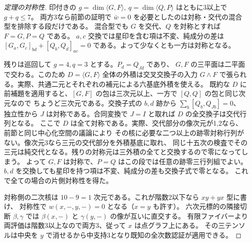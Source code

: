 \begin{proof}[定理の対称性]
印付きの $g=\dim\langle G,F\rangle,\ q=\dim\langle Q,P\rangle$ はともに3以上で $g+q\le7$。
両方3なら前節の証明で $\bar w=0$ を必要としたのは対称・交代の混合型を排除する段だけである。
混合型でも $G$ を交代、$Q$ を対称とすれば $F=G,P=Q$ である。
$a,c$ 交換では星印を含む項は不変、純成分の差は
$[G_a,G_c]_{bd}+[Q_b,Q_d]_{ac}=0$ である。よって少なくとも一方は対称となる。

残りは巡回して $g=4,q=3$ とする。$P_d=Q_{Jd}$ であり、
$G,F$ の三平面は二平面で交わる。このため $D=\langle G,F\rangle$ 全体の外積は交叉交換子の入力
$G\wedge F$ で張られる。実際、共通二元とそれぞれの補元による六基底外積を使える。
既約な $D$ に前補題を適用すると、$[G,F]$ の包は三次元以上、一方で $[Q,Q]$ の包と同じ次元なので
ちょうど三次元である。交換子式の $b,d$ 跡から $\sum_b[Q_b,Q_{Jb}]=0$、
独立性から $J$ は対称である。合同変換で $J=I$ と取れば $D$ の全交換子は交代行列となる。
ここで $D$ は全て対称である。実際、交代部分の像次元が1,2なら、前節と同じ中心化空間の議論により
その核に必要な二つ以上の跡零対称行列がない。像次元3なら三元の交代部分を外積基底に取れ、
同じ十五次の検査でその三元は純交代となる。残りの対称元は三外積の全てと交換するので零になってしまう。
よって $G,F$ は対称で、$P=Q$ はこの段では任意の跡零三行列組でよい。
$b,d$ を交換しても星印を持つ項は不変、純成分の差も交換子式で零となる。
これで全ての場合の片側対称性を得た。

対称側の二次核は $10-9=1$ 次元である。これが階数2以下なら $x y+ y x$ 型に書け、
対称性で $w(x,-,y,-)=0$ となる（$x=y$ も許す）。
六次元標的の隣接切断 $\beta,\gamma$ では $\beta(x,-)$ と $\gamma(y,-)$ の像が互いに直交する。
有限ファイバーより両評価は階数3以上なので両方3、従って $x$ は点グラフ上にある。
その三テンソルは中央を $y$ で消せるから中支持3となり既知の全次数認証が適用できる。
\end{proof}

